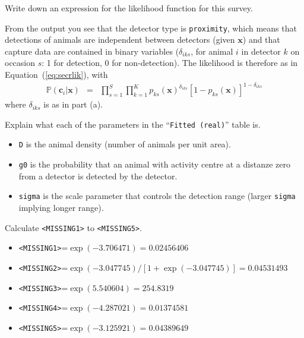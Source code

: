 \begin{questions}
\begin{parts}
{\begin{solution}
\end{solution}}

\item Write down an expression for the likelihood function for this survey.

{\begin{solution}
From the output you see that the detector type is \verb|proximity|, which means that detections of animals are independent between detectors (given $\mathbf{x}$) and that capture data are contained in binary variables ($\delta_{iks}$, for animal $i$ in detector $k$ on occasion $s$: 1 for detection, 0 for non-detection). The likelihood is therefore as in Equation~(\ref{eq:secrlik}), with
\begin{eqnarray}
\mathbb{P}(\mathbf{c}_i|\mathbf{x})&=&\prod_{s=1}^S\prod_{k=1}^K
p_{ks}(\mathbf{x})^{\delta_{iks}}[1-p_{ks}(\mathbf{x})]^{1-\delta_{iks}}\nonumber
\end{eqnarray}
\noindent 
where $\delta_{iks}$ is as in part (a).


\end{solution}}

\item Explain what each of the parameters in the ``\verb|Fitted (real)|'' table is.

{\begin{solution}
\begin{itemize}
\item \verb|D| is the animal density (number of animals per unit area).
\item \verb|g0| is the probability that an animal with activity centre at a distanze zero from a detector is detected by the detector.
\item \verb|sigma| is the scale parameter that controls the detection range (larger \verb|sigma| implying longer range).
\end{itemize}
\end{solution}}

\item Calculate \verb|<MISSING1>| to \verb|<MISSING5>|.

{\begin{solution}
\begin{itemize}
\item \verb|<MISSING1>|=$\exp(-3.706471)=0.02456406$
\item \verb|<MISSING2>|=$\exp(-3.047745)/[1+\exp(-3.047745)]=0.04531493$
\item \verb|<MISSING3>|=$\exp(5.540604)=254.8319$
\item \verb|<MISSING4>|=$\exp(-4.287021)=0.01374581$
\item \verb|<MISSING5>|=$\exp(-3.125921)=0.04389649$
\end{itemize}


\end{solution}}
\end{parts}
\end{questions}
